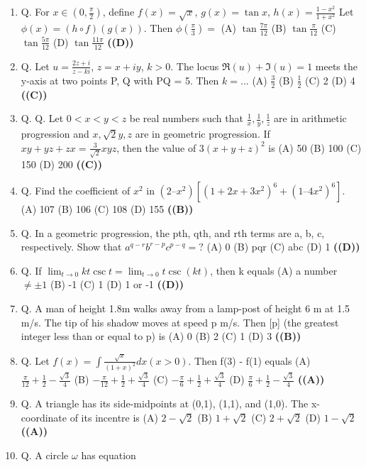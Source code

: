 \documentclass{article}
\begin{document}
\begin{enumerate}
\item Q. For $x \in (0, \frac{\pi}{2})$, define
$f(x) = \sqrt{x}$, $g(x) = \tan x$, $h(x) = \frac{1-x^2}{1+x^2}$
Let $\phi(x) = (h \circ f) (g(x))$. Then
$\phi(\frac{\pi}{3}) =$
(A) $\tan \frac{7\pi}{12}$
(B) $\tan \frac{\pi}{12}$
(C) $\tan \frac{5\pi}{12}$
(D) $\tan \frac{11\pi}{12}$ \hfill \textbf{((D))}
\item Q. Let
$u = \frac{2z + i}{z - ki}$, $z = x + iy$, $k > 0$.
The locus $\Re(u) + \Im(u) = 1$ meets the y-axis at two points P, Q with PQ = 5. Then
$k = ...$
(A) $\frac{3}{2}$
(B) $\frac{1}{2}$
(C) 2
(D) 4 \hfill \textbf{((C))}
\item Q. Q. Let $0 < x < y < z$ be real numbers such that $\frac{1}{x}, \frac{1}{y}, \frac{1}{z}$ are in arithmetic progression
and $x, \sqrt{2}y, z$ are in geometric progression. If
$xy + yz + zx = \frac{3}{\sqrt{2}} xyz$,
then the value of
$3 (x + y + z)^2$
is
(A) 50
(B) 100
(C) 150
(D) 200 \hfill \textbf{((C))}
\item Q. Find the coefficient of $x^2$ in
$(2 – x^2) [(1 + 2x + 3x^2)^6 + (1 – 4x^2)^6]$.
(A) 107
(B) 106
(C) 108
(D) 155 \hfill \textbf{((B))}
\item Q. In a geometric progression, the pth, qth, and rth terms are a, b, c, respectively. Show that
$a^{q-r} b^{r-p} c^{p-q} =?$
(A) 0
(B) pqr
(C) abc
(D) 1 \hfill \textbf{((D))}
\item Q. If
$\lim_{t\to 0} k t \csc t = \lim_{t\to 0} t \csc(kt)$,
then k equals
(A) a number $\neq \pm1$
(B) -1
(C) 1
(D) 1 or -1 \hfill \textbf{((D))}
\item Q. A man of height 1.8m walks away from a lamp-post of height 6 m at 1.5 m/s. The tip of
his shadow moves at speed p m/s. Then [p] (the greatest integer less than or equal to p) is
(A) 0
(B) 2
(C) 1
(D) 3 \hfill \textbf{((B))}
\item Q. Let
$f(x) = \int \frac{\sqrt{x}}{(1+x)^2} dx (x > 0)$.
Then f(3) - f(1) equals
(A) $\frac{\pi}{12} + \frac{1}{2} - \frac{\sqrt{3}}{4}$
(B) $-\frac{\pi}{12} + \frac{1}{2} + \frac{\sqrt{3}}{4}$
(C) $-\frac{\pi}{6} + \frac{1}{2} + \frac{\sqrt{3}}{4}$
(D) $\frac{\pi}{6} + \frac{1}{2} - \frac{\sqrt{3}}{4}$ \hfill \textbf{((A))}
\item Q. A triangle has its side-midpoints at (0,1), (1,1), and (1,0). The x-coordinate of its
incentre is
(A) $2-\sqrt{2}$
(B) $1 + \sqrt{2}$
(C) $2 + \sqrt{2}$
(D) $1 - \sqrt{2}$ \hfill \textbf{((A))}
\item Q. A circle $\omega$ has equation

\end{enumerate}
\end{document}
